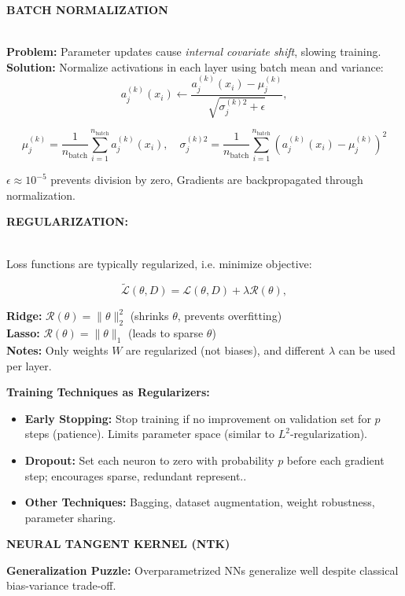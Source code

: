 \documentclass[a4paper,10pt]{article}
\newenvironment{myitemize}
{\vspace{-0.25cm}\begin{itemize}}
{\end{itemize}}
\newcommand{\subtitle}[1]{\vspace{0.25cm}\begin{normalsize}\textbf{\textcolor{gray!150}{\uppercase{#1}}}\end{normalsize}}
\begin{document}
\begin{small}
\subtitle{Batch Normalization} \\
\textbf{Problem:} Parameter updates cause \textit{internal covariate shift}, slowing training. \\
\textbf{Solution:} Normalize activations in each layer using batch mean and variance:
$$
a_j^{(k)}(x_i) \leftarrow \frac{a_j^{(k)}(x_i) - \mu_j^{(k)}}{\sqrt{\sigma_j^{(k)2} + \epsilon}},
$$
\begin{footnotesize}
$$
\mu_j^{(k)} = \frac{1}{n_{\text{batch}}} \sum_{i=1}^{n_{\text{batch}}} a_j^{(k)}(x_i), \quad \sigma_j^{(k)2} = \frac{1}{n_{\text{batch}}} \sum_{i=1}^{n_{\text{batch}}} \left(a_j^{(k)}(x_i) - \mu_j^{(k)}\right)^2
$$
\end{footnotesize}
$\epsilon \approx 10^{-5}$ prevents division by zero, Gradients are backpropagated through normalization.

\subtitle{Regularization:} \\
Loss functions are typically regularized, i.e. minimize objective: 

$$
\tilde{\mathcal{L}}(\theta, D) = \mathcal{L}(\theta, D) + \lambda \mathcal{R}(\theta),
$$

\textbf{Ridge:} $\mathcal{R}(\theta) = \|\theta\|_2^2$ (shrinks $\theta$, prevents overfitting) \\
\textbf{Lasso:} $\mathcal{R}(\theta) = \|\theta\|_1$ (leads to sparse $\theta$) \\
\textbf{Notes:} Only weights $W$ are regularized (not biases), and different $\lambda$ can be used per layer.

\textbf{Training Techniques as Regularizers:}

\begin{myitemize}
    \item \textbf{Early Stopping:} Stop training if no improvement on validation set for $p$ steps (patience). Limits parameter space (similar to $L^2$-regularization).
    \item \textbf{Dropout:} Set each neuron to zero with probability $p$ before each gradient step; encourages sparse, redundant represent..
    \item \textbf{Other Techniques:} Bagging, dataset augmentation, weight robustness, parameter sharing.
\end{myitemize}

\subtitle{Neural Tangent Kernel (NTK)}

\textbf{Generalization Puzzle:} Overparametrized NNs generalize well despite classical bias-variance trade-off.


\end{small}
\end{document}
